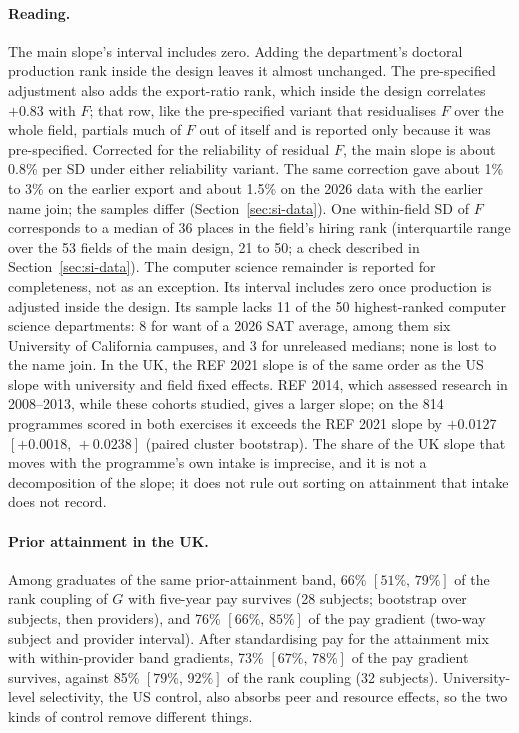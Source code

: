 \documentclass[11pt]{article}
\newcommand{\ci}[2]{$[#1,\allowbreak\,#2]$}
\begin{document}
\paragraph{Reading.} The main slope's interval includes zero. Adding the department's doctoral production rank inside
the design leaves it almost unchanged. The pre-specified adjustment also adds the export-ratio rank, which inside the
design correlates $+0.83$ with $F$; that row, like the pre-specified variant that residualises $F$ over the whole
field, partials much of $F$ out of itself and is reported only because it was pre-specified. Corrected for the
reliability of residual $F$, the main slope is about 0.8\% per SD under either reliability variant. The same
correction gave about 1\% to 3\% on the earlier export and about 1.5\% on the 2026 data with the earlier name join;
the samples differ (Section~\ref{sec:si-data}). One within-field SD of $F$ corresponds to a median of 36 places in
the field's hiring rank (interquartile range over the 53 fields of the main design, 21 to 50; a check described in
Section~\ref{sec:si-data}). The computer science remainder is reported for completeness, not as an exception. Its
interval includes
zero once production is adjusted inside the design. Its sample lacks 11 of the 50 highest-ranked computer science
departments: 8 for want of a 2026 SAT average, among them six University of California campuses, and 3 for
unreleased medians; none is lost to the name join. In the UK, the REF 2021 slope is of the same order as the US slope
with university and field fixed effects. REF 2014, which assessed research in 2008--2013, while these cohorts studied,
gives a larger slope; on the 814 programmes scored in both exercises it exceeds the REF 2021 slope by $+0.0127$
\ci{+0.0018}{+0.0238} (paired cluster bootstrap). The share of the UK slope that moves with the programme's own intake
is imprecise, and it is not a decomposition of the slope; it does not rule out sorting on attainment that intake does
not record.

\paragraph{Prior attainment in the UK.} Among graduates of the same prior-attainment band,
66\% \ci{51\%}{79\%} of the rank coupling of $G$ with five-year pay survives (28 subjects; bootstrap over subjects,
then providers), and 76\% \ci{66\%}{85\%} of the pay gradient (two-way subject and provider interval). After
standardising pay for the attainment mix with within-provider band gradients, 73\% \ci{67\%}{78\%} of the pay
gradient survives, against 85\% \ci{79\%}{92\%} of the rank coupling (32 subjects). University-level selectivity,
the US control, also absorbs peer and resource effects, so the two kinds of control remove different things.
\end{document}
